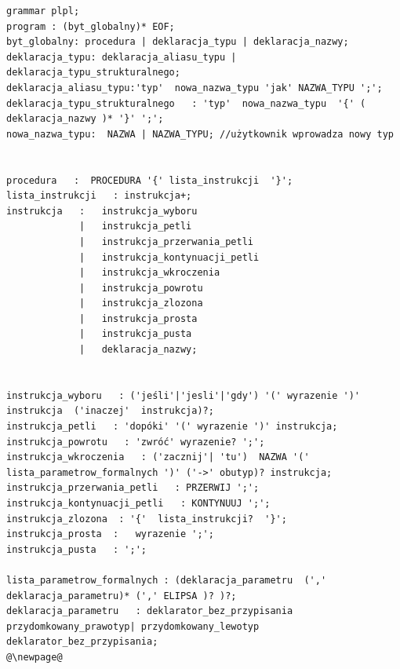 \lstset{
    escapechar=@,
    breaklines=true
}
\begin{lstlisting}[basicstyle=\scriptsize\ttfamily,breaklines=true]
grammar plpl;
program : (byt_globalny)* EOF;
byt_globalny: procedura | deklaracja_typu | deklaracja_nazwy;
deklaracja_typu: deklaracja_aliasu_typu | deklaracja_typu_strukturalnego;
deklaracja_aliasu_typu:'typ'  nowa_nazwa_typu 'jak' NAZWA_TYPU ';';
deklaracja_typu_strukturalnego   : 'typ'  nowa_nazwa_typu  '{' ( deklaracja_nazwy )* '}' ';';
nowa_nazwa_typu:  NAZWA | NAZWA_TYPU; //użytkownik wprowadza nowy typ


procedura   :  PROCEDURA '{' lista_instrukcji  '}';
lista_instrukcji   : instrukcja+;
instrukcja   :   instrukcja_wyboru
             |   instrukcja_petli
             |   instrukcja_przerwania_petli
             |   instrukcja_kontynuacji_petli
             |   instrukcja_wkroczenia
             |   instrukcja_powrotu
             |   instrukcja_zlozona
             |   instrukcja_prosta
             |   instrukcja_pusta
             |   deklaracja_nazwy;


instrukcja_wyboru   : ('jeśli'|'jesli'|'gdy') '(' wyrazenie ')' instrukcja  ('inaczej'  instrukcja)?;
instrukcja_petli   : 'dopóki' '(' wyrazenie ')' instrukcja;
instrukcja_powrotu   : 'zwróć' wyrazenie? ';';
instrukcja_wkroczenia   : ('zacznij'| 'tu')  NAZWA '(' lista_parametrow_formalnych ')' ('->' obutyp)? instrukcja;
instrukcja_przerwania_petli   : PRZERWIJ ';';
instrukcja_kontynuacji_petli   : KONTYNUUJ ';';
instrukcja_zlozona  : '{'  lista_instrukcji?  '}';
instrukcja_prosta  :   wyrazenie ';';
instrukcja_pusta   : ';';

lista_parametrow_formalnych : (deklaracja_parametru  (',' deklaracja_parametru)* (',' ELIPSA )? )?;
deklaracja_parametru   : deklarator_bez_przypisania przydomkowany_prawotyp| przydomkowany_lewotyp  deklarator_bez_przypisania;
@\newpage@


\end{lstlisting}
